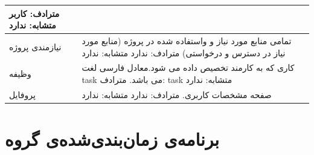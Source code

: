 \documentclass{article}
\begin{document}
\begin{tabular}{|p{2cm}|p{10cm}|}
\newline
				مترادف: کاربر
				\newline
				متشابه: ندارد
\\
\hline
نیازمندی پروژه
&
تمامی منابع مورد نیاز و واستفاده شده در پروژه (منابع مورد نیاز در دسترس و
 درخواستی)
 \newline
				مترادف: ندارد
				\newline
				متشابه: ندارد
\\
\hline
وظیفه	
&
کاری که به کارمند تخصیص داده می شود.معادل فارسی لغت task می باشد.
\newline
				مترادف: task
				\newline
				متشابه: ندارد
\\
\hline
پروفایل
&
صفحه مشخصات کاربری.
\newline
				مترادف: ندارد
				\newline
				متشابه: ندارد
				\\
\hline

\end{tabular}


\newpage
\section{برنامه‌ی زمان‌بندی‌شده‌ی گروه‌}
\end{document}
